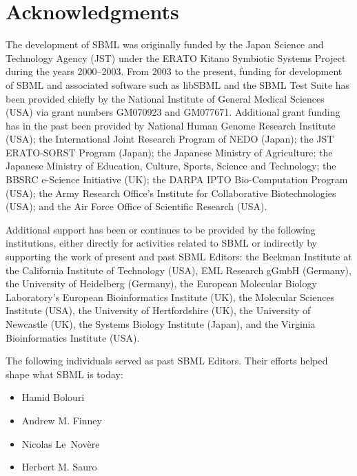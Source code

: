 
\section{Acknowledgments}
\label{sec:acknowledgements}
\label{sec:acknowledgments}

The development of SBML was originally funded by the Japan Science
and Technology Agency (JST) under the ERATO Kitano Symbiotic
Systems Project during the years 2000--2003.  From 2003 to the
present, funding for development of SBML and associated software
such as libSBML and the SBML Test Suite has been provided chiefly
by the National Institute of General Medical Sciences (USA) via
grant numbers GM070923 and GM077671.  Additional grant funding has
in the past been provided by National Human Genome Research
Institute (USA); the International Joint Research Program of NEDO
(Japan); the JST ERATO-SORST Program (Japan); the Japanese
Ministry of Agriculture; the Japanese Ministry of Education,
Culture, Sports, Science and Technology; the BBSRC e-Science
Initiative (UK); the DARPA IPTO Bio-Computation Program (USA); the
Army Research Office's Institute for Collaborative Biotechnologies
(USA); and the Air Force Office of Scientific Research (USA).

Additional support has been or continues to be provided by the
following institutions, either directly for activities related to
SBML or indirectly by supporting the work of present and past SBML
Editors: the Beckman Institute at the California Institute of
Technology (USA), EML Research gGmbH (Germany), the University of
Heidelberg (Germany), the European Molecular Biology Laboratory's
European Bioinformatics Institute (UK), the Molecular Sciences
Institute (USA), the University of Hertfordshire (UK), the
University of Newcastle (UK), the Systems Biology Institute
(Japan), and the Virginia Bioinformatics Institute (USA).

The following individuals served as past SBML Editors.  Their
efforts helped shape what SBML is today:
\begin{itemize}\setlength{\parskip}{-0.2ex}

\item Hamid Bolouri
\item Andrew M. Finney
\item Nicolas Le~Nov\`{e}re
\item Herbert M. Sauro

\end{itemize}

